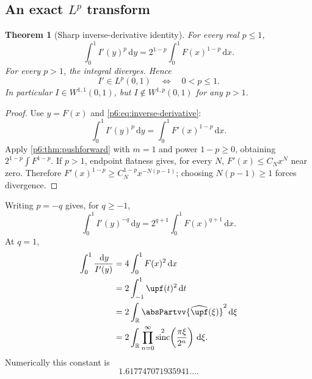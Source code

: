 \documentclass[11pt,oneside]{article}
\newtheorem{theorem}{Theorem}[section]
\theoremstyle{definition}
\theoremstyle{remark}
\newcommand{\R}{\mathbb R}
\newcommand{\dd}{\,\mathrm d}
\newcommand{\1}{\mathbf 1}
\DeclareMathOperator{\sinc}{sinc}
\begin{document}
\subsection{An exact \(L^p\) transform}

\begin{theorem}[Sharp inverse-derivative identity]
\label{p6:thm:inverse-derivative-Lp}
For every real \(p\le1\),
\begin{equation}
 \boxed{
 \int_0^1I'(y)^p\dd y
 =2^{1-p}\int_0^1F(x)^{1-p}\dd x.
 }                                                        \label{p6:eq:inverse-derivative-Lp}
\end{equation}
For every \(p>1\), the integral diverges.  Hence
\begin{equation}
 I'\in L^p(0,1)\quad\Longleftrightarrow\quad0<p\le1.     \label{p6:eq:Iprime-threshold}
\end{equation}
In particular \(I\in W^{1,1}(0,1)\), but \(I\notin W^{1,p}(0,1)\) for any
\(p>1\).
\end{theorem}

\begin{proof}
Use \(y=F(x)\) and \eqref{p6:eq:inverse-derivative}:
\[
 \int_0^1I'(y)^p\dd y
 =\int_0^1F'(x)^{1-p}\dd x.
\]
Apply \cref{p6:thm:pushforward} with \(m=1\) and power \(1-p\ge0\), obtaining
\(2^{1-p}\int F^{1-p}\).  If \(p>1\), endpoint flatness gives, for every \(N\),
\(F'(x)\le C_Nx^N\) near zero.  Therefore
\(F'(x)^{1-p}\ge C_N^{1-p}x^{-N(p-1)}\); choosing \(N(p-1)\ge1\) forces divergence.
\end{proof}

Writing \(p=-q\) gives, for \(q\ge-1\),
\begin{equation}
 \int_0^1I'(y)^{-q}\dd y
 =2^{q+1}\int_0^1F(x)^{q+1}\dd x.                        \label{p6:eq:inverse-reciprocal-moments}
\end{equation}
At \(q=1\),
\begin{align}
 \int_0^1\frac{\dd y}{I'(y)}
 &=4\int_0^1F(x)^2\dd x                                  \label{p6:eq:reciprocal-Iprime-F2}\\
 &=2\int_{-1}^1\upf(t)^2\dd t                            \\
 &=2\int_{\R}\absPartvv{\widehat{\upf}(\xi)}^2\dd\xi        \label{p6:eq:reciprocal-Iprime-fourier}\\
 &=2\int_\R\prod_{n=0}^{\infty}
   \sinc^2\!\left(\frac{\pi\xi}{2^n}\right)\dd\xi.
\end{align}
Numerically this constant is
\begin{equation}
 1.617747071935941\ldots.                                  \label{p6:eq:reciprocal-Iprime-numeric}
\end{equation}
\end{document}
